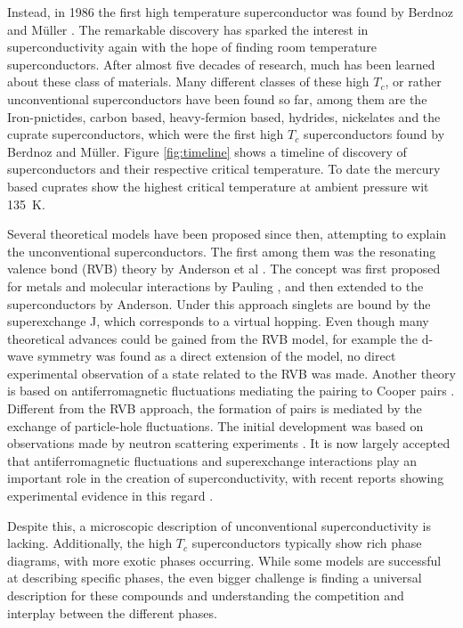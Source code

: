Instead, in 1986 the first high temperature superconductor was found by Berdnoz and Müller \cite{bednorz_possible_1986}.
The remarkable discovery has sparked the interest in superconductivity again with the hope of finding room temperature superconductors.
After almost five decades of research, much has been learned about these class of materials.
Many different classes of these high $T_c$, or rather unconventional superconductors have been found so far, among them are the Iron-pnictides, carbon based, heavy-fermion based, hydrides, nickelates and the cuprate superconductors, which were the first high $T_c$ superconductors found by Berdnoz and Müller.
Figure \ref{fig:timeline} shows a timeline of discovery of superconductors and their respective critical temperature.
To date the mercury based cuprates show the highest critical temperature at ambient pressure wit \qty{135}{\kelvin}.

Several theoretical models have been proposed since then, attempting to explain the unconventional superconductors.
The first among them was the resonating valence bond (RVB) theory by Anderson et al \cite{anderson_resonating_1973,anderson_resonating--valence-bond_1987}.
The concept was first proposed for metals and molecular interactions by Pauling \cite{pauling_nature_1938, pauling_nature_1948}, and then extended to the superconductors by Anderson.
Under this approach singlets are bound by the superexchange J, which corresponds to a virtual hopping.
Even though many theoretical advances could be gained from the RVB model, for example the d-wave symmetry was found as a direct extension of the model, no direct experimental observation of a state related to the RVB was made.
Another theory is based on antiferromagnetic fluctuations mediating the pairing to Cooper pairs \cite{bickers_cdw_1987}.
Different from the RVB approach, the formation of pairs is mediated by the exchange of particle-hole fluctuations.
The initial development was based on observations made by neutron scattering experiments \cite{mook_polarized_1993,hayden_structure_2004,dahm_strength_2009}.
It is now largely accepted that antiferromagnetic fluctuations and superexchange interactions play an important role in the creation of superconductivity, with recent reports showing experimental evidence in this regard \cite{kowalski_oxygen_2021,omahony_electron_2022}.

Despite this, a microscopic description of unconventional superconductivity is lacking.
Additionally, the high $T_c$ superconductors typically show rich phase diagrams, with more exotic phases occurring.
While some models are successful at describing specific phases, the even bigger challenge is finding a universal description for these compounds and understanding the competition and interplay between the different phases.

